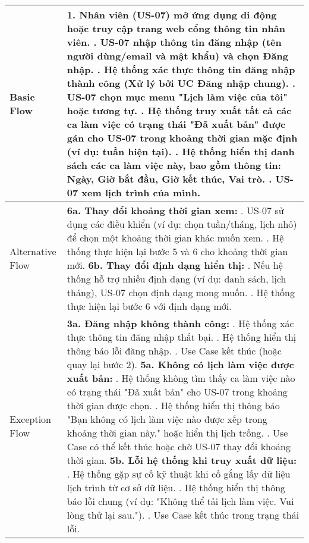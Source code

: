 \begin{longtable}{|m{4cm}|p{11cm}|}
Basic Flow & 1. Nhân viên (US-07) mở ứng dụng di động hoặc truy cập trang web cổng thông tin nhân viên. \newline 2. US-07 nhập thông tin đăng nhập (tên người dùng/email và mật khẩu) và chọn Đăng nhập. \newline 3. Hệ thống xác thực thông tin đăng nhập thành công (Xử lý bởi UC Đăng nhập chung). \newline 4. US-07 chọn mục menu "Lịch làm việc của tôi" hoặc tương tự. \newline 5. Hệ thống truy xuất tất cả các ca làm việc có trạng thái "Đã xuất bản" được gán cho US-07 trong khoảng thời gian mặc định (ví dụ: tuần hiện tại). \newline 6. Hệ thống hiển thị danh sách các ca làm việc này, bao gồm thông tin: Ngày, Giờ bắt đầu, Giờ kết thúc, Vai trò. \newline 7. US-07 xem lịch trình của mình. \\
\hline
Alternative Flow & \textbf{6a. Thay đổi khoảng thời gian xem:} \newline    1. US-07 sử dụng các điều khiển (ví dụ: chọn tuần/tháng, lịch nhỏ) để chọn một khoảng thời gian khác muốn xem. \newline    2. Hệ thống thực hiện lại bước 5 và 6 cho khoảng thời gian mới. \newline \textbf{6b. Thay đổi định dạng hiển thị:} \newline    1. Nếu hệ thống hỗ trợ nhiều định dạng (ví dụ: danh sách, lịch tháng), US-07 chọn định dạng mong muốn. \newline    2. Hệ thống thực hiện lại bước 6 với định dạng mới. \\
\hline
Exception Flow & \textbf{3a. Đăng nhập không thành công:} \newline    1. Hệ thống xác thực thông tin đăng nhập thất bại. \newline    2. Hệ thống hiển thị thông báo lỗi đăng nhập. \newline    3. Use Case kết thúc (hoặc quay lại bước 2). \newline \textbf{5a. Không có lịch làm việc được xuất bản:} \newline    1. Hệ thống không tìm thấy ca làm việc nào có trạng thái "Đã xuất bản" cho US-07 trong khoảng thời gian được chọn. \newline    2. Hệ thống hiển thị thông báo "Bạn không có lịch làm việc nào được xếp trong khoảng thời gian này." hoặc hiển thị lịch trống. \newline    3. Use Case có thể kết thúc hoặc chờ US-07 thay đổi khoảng thời gian. \newline \textbf{5b. Lỗi hệ thống khi truy xuất dữ liệu:} \newline    1. Hệ thống gặp sự cố kỹ thuật khi cố gắng lấy dữ liệu lịch trình từ cơ sở dữ liệu. \newline    2. Hệ thống hiển thị thông báo lỗi chung (ví dụ: "Không thể tải lịch làm việc. Vui lòng thử lại sau."). \newline    3. Use Case kết thúc trong trạng thái lỗi. \\

\end{longtable}
